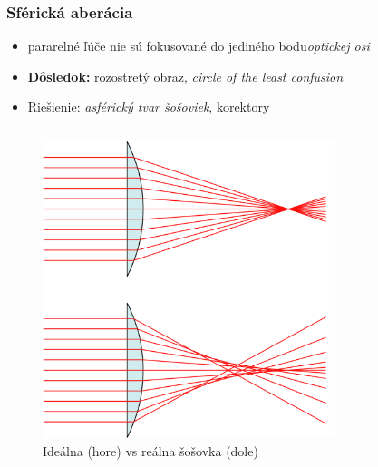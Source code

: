 \documentclass[10pt,xcolor=pdflatex]{beamer}
\begin{document}
\begin{frame}\frametitle{Sférická aberácia}
    \begin{itemize}
        \item pararelné ľúče nie sú fokusované do jediného bodu\textit{optickej osi}
        \item \textbf{Dôsledok:} rozostretý obraz, \textit{circle of the least confusion}
        \item Riešienie: \textit{asférický tvar šošoviek}, korektory
    \end{itemize}

    \begin{columns}
    \begin{figure}
        \includegraphics[scale=0.1]{img/sphericalAberrationWikipedia.png}
        \caption{Ideálna (hore) vs reálna šošovka (dole)}
    \end{figure}
    \begin{figure}

\end{figure}
\end{columns}
\end{frame}
\end{document}
